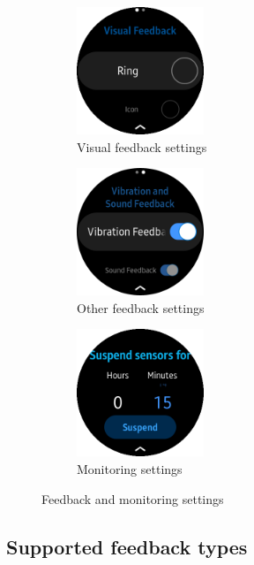 \documentclass[conference, a4paper, 10pt, twocolumn]{IEEEtran}
\begin{document}
\begin{figure}[t!]
    \centering
    \begin{subfigure}[t]{0.32\textwidth}
        \centering
        \includegraphics[height=1.5in]{img/settingsVisualFeedback.png}
        \caption{Visual feedback settings}
        \label{fig:visualFeedbackSettings}
    \end{subfigure}%
    \begin{subfigure}[t]{0.32\textwidth}
        \centering
        \includegraphics[height=1.5in]{img/settingsOtherFeedback.png}
        \caption{Other feedback settings}
        \label{fig:otherFeedbackSettings}
    \end{subfigure}
    \begin{subfigure}[t]{0.32\textwidth}
        \centering
        \includegraphics[height=1.5in]{img/settingsSuspend.png}
        \caption{Monitoring settings}
        \label{fig:monitoringSettings}
    \end{subfigure}
    \caption{Feedback and monitoring settings}
    \label{fig:feedbackSettingsImage}
\end{figure}

\subsection{\textbf{Supported feedback types}}
\end{document}
